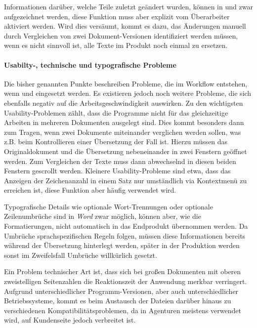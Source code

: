 Informationen darüber, welche Teile zuletzt geändert wurden, können in  und  zwar aufgezeichnet werden, diese Funktion muss aber explizit vom Überarbeiter aktiviert werden. Wird dies versäumt, kommt es dazu, das Änderungen manuell durch Vergleichen von zwei Dokument-Versionen identifiziert werden müssen, wenn es nicht sinnvoll ist, alle Texte im Produkt noch einmal zu ersetzen.

\paragraph{Usabilty-, technische und typografische Probleme} Die bisher genannten Punkte beschreiben Probleme, die im Workflow entstehen, wenn  und  eingesetzt werden. Es existieren jedoch noch weitere Probleme, die sich ebenfalls negativ auf die Arbeitsgeschwindigkeit auswirken. Zu den wichtigsten Usability-Problemen zählt, dass die Programme nicht für das gleichzeitige Arbeiten in mehreren Dokumenten ausgelegt sind. Dies kommt besonders dann zum Tragen, wenn zwei Dokumente miteinander verglichen werden sollen, was z.B. beim Kontrollieren einer Übersetzung der Fall ist. Hierzu müssen das Originaldokument und die Übersetzung nebeneinander in zwei Fenstern geöffnet werden. Zum Vergleichen der Texte muss dann abwechselnd in diesen beiden Fenstern gescrollt werden. Kleinere Usability-Probleme sind etwa, dass das Anzeigen der Zeichenanzahl in einem Satz nur umständlich via Kontextmenü zu erreichen ist, diese Funktion aber häufig verwendet wird. 

Typografische Details wie optionale Wort-Trennungen oder optionale Zeilenumbrüche sind in \emph{Word} zwar möglich, können aber, wie die Formatierungen, nicht automatisch in das Endprodukt übernommen werden. Da Umbrüche sprachspezifischen Regeln folgen, müssen diese Informationen bereits während der Übersetzung hinterlegt werden, später in der Produktion werden sonst im Zweifelsfall Umbrüche willkürlich gesetzt. 

Ein Problem technischer Art ist, dass sich bei großen Dokumenten mit oberen zweistelligen Seitenzahlen die Reaktionszeit der Anwendung merkbar verringert. Aufgrund unterschiedlicher Programm-Versionen, aber auch unterschiedlicher Betriebssysteme, kommt es beim Austausch der Dateien darüber hinaus zu verschiedenen Kompatibilitätsproblemen, da in Agenturen meistens  verwendet wird, auf Kundenseite jedoch  verbreitet ist.

